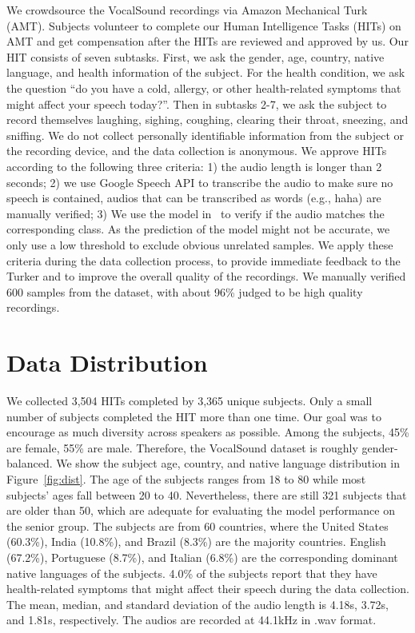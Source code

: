 \documentclass{article}
\newcommand{\squeezeup}{\vspace{-1.6mm}}
\begin{document}
We crowdsource the VocalSound recordings via Amazon Mechanical Turk (AMT). Subjects volunteer to complete our Human Intelligence Tasks (HITs) on AMT and get compensation after the HITs are reviewed and approved by us. Our HIT consists of seven subtasks. First, we ask the gender, age, country, native language, and health information of the subject. For the health condition, we ask the question ``do you have a cold, allergy, or other health-related symptoms that might affect your speech today?''. Then in subtasks 2-7, we ask the subject to record themselves laughing, sighing, coughing, clearing their throat, sneezing, and sniffing.  We do not collect personally identifiable information from the subject or the recording device, and the data collection is anonymous. We approve HITs according to the following three criteria: 1) the audio length is longer than 2 seconds; 2) we use Google Speech API to transcribe the audio to make sure no speech is contained, audios that can be transcribed as words (e.g., haha) are manually verified; 3) We use the model in~\cite{gong2021psla} to verify if the audio matches the corresponding class. As the prediction of the model might not be accurate, we only use a low threshold to exclude obvious unrelated samples. We apply these criteria during the data collection process, to provide immediate feedback to the Turker and to improve the overall quality of the recordings. We manually verified 600 samples from the dataset, with about 96\% judged to be high quality recordings.



\squeezeup\squeezeup
\section{Data Distribution}
\label{sec:split}
\squeezeup

We collected 3,504 HITs completed by 3,365 unique subjects. Only a small number of subjects completed the HIT more than one time. Our goal was to encourage as much diversity across speakers as possible.  Among the subjects, 45\% are female, 55\% are male. Therefore, the VocalSound dataset is roughly gender-balanced. We show the subject age, country, and native language distribution in Figure~\ref{fig:dist}. The age of the subjects ranges from 18 to 80 while most subjects' ages fall between 20 to 40. Nevertheless, there are still 321 subjects that are older than 50, which are adequate for evaluating the model performance on the senior group. The subjects are from 60 countries, where the United States (60.3\%), India (10.8\%), and Brazil (8.3\%) are the majority countries. English (67.2\%), Portuguese (8.7\%), and Italian (6.8\%) are the corresponding dominant native languages of the subjects. 4.0\% of the subjects report that they have health-related symptoms that might affect their speech during the data collection. The mean, median, and standard deviation of the audio length is 4.18s, 3.72s, and 1.81s, respectively. The audios are recorded at 44.1kHz in .wav format.
\end{document}
